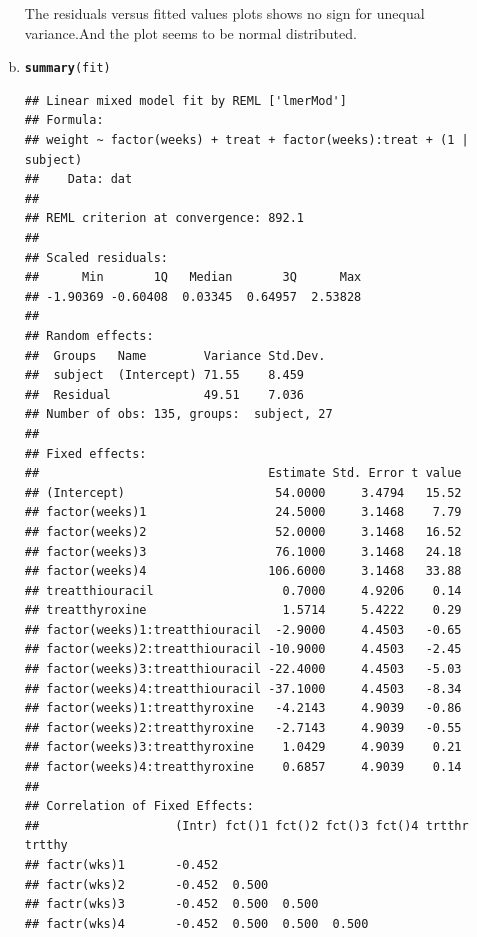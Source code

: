 \documentclass{article}\usepackage[]{graphicx}\usepackage[]{color}
\makeatletter
\newcommand{\hlstd}[1]{\textcolor[rgb]{0.345,0.345,0.345}{#1}}%
\newcommand{\hlkwd}[1]{\textcolor[rgb]{0.737,0.353,0.396}{\textbf{#1}}}%
\newenvironment{kframe}{%
 \def\at@end@of@kframe{}%
 \ifinner\ifhmode%
  \def\at@end@of@kframe{\end{minipage}}%
  \begin{minipage}{\columnwidth}%
 \fi\fi%
 \def\FrameCommand##1{\hskip\@totalleftmargin \hskip-\fboxsep
 \colorbox{shadecolor}{##1}\hskip-\fboxsep
     \hskip-\linewidth \hskip-\@totalleftmargin \hskip\columnwidth}%
 \MakeFramed {\advance\hsize-\width
   \@totalleftmargin\z@ \linewidth\hsize
   \@setminipage}}%
 {\par\unskip\endMakeFramed%
 \at@end@of@kframe}
\newenvironment{knitrout}{}{} %
\makeatother
\begin{document}
\begin{enumerate}[(a)]
\begin{knitrout}
\end{knitrout}

\qquad The residuals versus fitted values plots shows no sign for unequal variance.And the plot seems to be normal distributed.

\item

\begin{knitrout}
\color{fgcolor}\begin{kframe}
\begin{alltt}
  \hlkwd{summary}\hlstd{(fit)}
\end{alltt}
\begin{verbatim}
## Linear mixed model fit by REML ['lmerMod']
## Formula: 
## weight ~ factor(weeks) + treat + factor(weeks):treat + (1 | subject)
##    Data: dat
## 
## REML criterion at convergence: 892.1
## 
## Scaled residuals: 
##      Min       1Q   Median       3Q      Max 
## -1.90369 -0.60408  0.03345  0.64957  2.53828 
## 
## Random effects:
##  Groups   Name        Variance Std.Dev.
##  subject  (Intercept) 71.55    8.459   
##  Residual             49.51    7.036   
## Number of obs: 135, groups:  subject, 27
## 
## Fixed effects:
##                                Estimate Std. Error t value
## (Intercept)                     54.0000     3.4794   15.52
## factor(weeks)1                  24.5000     3.1468    7.79
## factor(weeks)2                  52.0000     3.1468   16.52
## factor(weeks)3                  76.1000     3.1468   24.18
## factor(weeks)4                 106.6000     3.1468   33.88
## treatthiouracil                  0.7000     4.9206    0.14
## treatthyroxine                   1.5714     5.4222    0.29
## factor(weeks)1:treatthiouracil  -2.9000     4.4503   -0.65
## factor(weeks)2:treatthiouracil -10.9000     4.4503   -2.45
## factor(weeks)3:treatthiouracil -22.4000     4.4503   -5.03
## factor(weeks)4:treatthiouracil -37.1000     4.4503   -8.34
## factor(weeks)1:treatthyroxine   -4.2143     4.9039   -0.86
## factor(weeks)2:treatthyroxine   -2.7143     4.9039   -0.55
## factor(weeks)3:treatthyroxine    1.0429     4.9039    0.21
## factor(weeks)4:treatthyroxine    0.6857     4.9039    0.14
## 
## Correlation of Fixed Effects:
##                   (Intr) fct()1 fct()2 fct()3 fct()4 trtthr trtthy
## factr(wks)1       -0.452                                          
## factr(wks)2       -0.452  0.500                                   
## factr(wks)3       -0.452  0.500  0.500                            
## factr(wks)4       -0.452  0.500  0.500  0.500                     

\end{verbatim}
\end{kframe}
\end{knitrout}
\end{enumerate}
\end{document}
